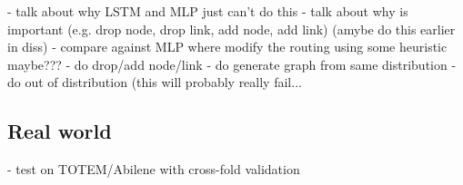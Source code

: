 - talk about why LSTM and MLP just can't do this
- talk about why is important (e.g. drop node, drop link, add node, add link) (amybe do this earlier in diss)
- compare against MLP where modify the routing using some heuristic maybe???
- do drop/add node/link
- do generate graph from same distribution
- do out of distribution (this will probably really fail...

\subsection{Real world}

- test on TOTEM/Abilene with cross-fold validation